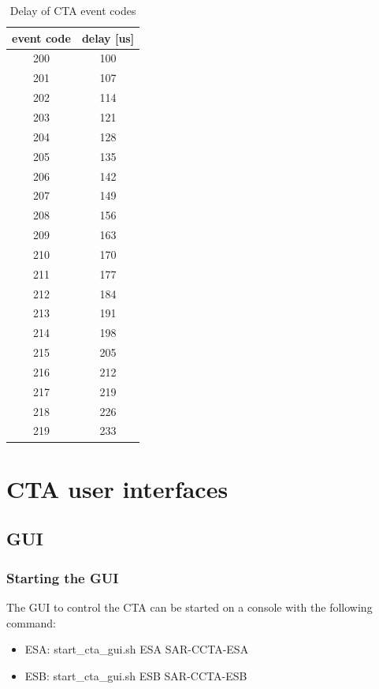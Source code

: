 \documentclass[12pt,a4paper]{article}
\let\stdsection\section
\renewcommand\section{\newpage\stdsection}
\begin{document}
\begin{table}[!hbt]
\caption{Delay of CTA event codes}
\label{tab:cta_event_delays}
\centering
  \begin{tabular}{|c|c|}
    \hline \textbf{event code} & \textbf{delay [us]} \\ \hline
    \hline 200 & 100\\
    \hline 201 & 107\\
    \hline 202 & 114\\
    \hline 203 & 121\\
    \hline 204 & 128\\
    \hline 205 & 135\\
    \hline 206 & 142\\
    \hline 207 & 149\\
    \hline 208 & 156\\
    \hline 209 & 163\\
    \hline 210 & 170\\
    \hline 211 & 177\\
    \hline 212 & 184\\
    \hline 213 & 191\\
    \hline 214 & 198\\
    \hline 215 & 205\\
    \hline 216 & 212\\
    \hline 217 & 219\\
    \hline 218 & 226\\
    \hline 219 & 233\\
    \hline
  \end{tabular}
\end{table}

\section{CTA user interfaces}\label{sec:CtaUserInterfaces}
\subsection{GUI}
\subsubsection{Starting the GUI}
The GUI to control the CTA can be started on a console with the following
command:
\begin{itemize}
\item
ESA: start\_cta\_gui.sh ESA SAR-CCTA-ESA
\item
ESB: start\_cta\_gui.sh ESB SAR-CCTA-ESB
\end{itemize}
\end{document}
